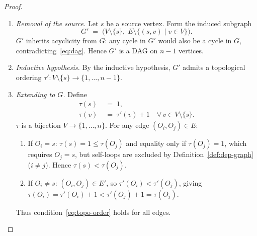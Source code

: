 \documentclass[12pt,openany]{book}
\numberwithin{equation}{chapter}
\theoremstyle{plain}
\theoremstyle{definition}
\theoremstyle{remark}
\numberwithin{equation}{chapter}
\theoremstyle{plain}
\begin{document}
\begin{proof}
\begin{enumerate}
\begin{enumerate}
          \item \emph{Removal of the source.}
                Let $s$ be a source vertex.  Form the induced subgraph
                \begin{equation}
                  G' \;=\; \bigl(V \setminus \{s\},\;
                    E \setminus \{(s, v) \mid v \in V\}\bigr).
                  \label{eq:induced-sub}
                \end{equation}
                $G'$ inherits acyclicity from $G$: any cycle in $G'$
                would also be a cycle in $G$, contradicting~\eqref{eq:dag}.
                Hence $G'$ is a DAG on $n-1$ vertices.

          \item \emph{Inductive hypothesis.}
                By the inductive hypothesis, $G'$ admits a topological
                ordering $\tau' : V \setminus \{s\} \to \{1, \ldots, n-1\}$.

          \item \emph{Extending to $G$.}
                Define
                \begin{align}
                  \tau(s)   &\;=\; 1, \label{eq:tau-source}\\
                  \tau(v)   &\;=\; \tau'(v) + 1
                    \quad \forall\, v \in V \setminus \{s\}.
                    \label{eq:tau-rest}
                \end{align}
                $\tau$ is a bijection $V \to \{1, \ldots, n\}$.
                For any edge $(O_i, O_j) \in E$:
                \begin{enumerate}
                  \item If $O_i = s$: $\tau(s) = 1 \leq \tau(O_j)$
                        and equality only if $\tau(O_j) = 1$, which
                        requires $O_j = s$, but self-loops are excluded
                        by Definition~\ref{def:dep-graph} ($i \neq j$).
                        Hence $\tau(s) < \tau(O_j)$.
                  \item If $O_i \neq s$: $(O_i, O_j) \in E'$, so
                        $\tau'(O_i) < \tau'(O_j)$, giving
                        $\tau(O_i) = \tau'(O_i)+1 < \tau'(O_j)+1
                        = \tau(O_j)$.
                \end{enumerate}
                Thus condition~\eqref{eq:topo-order} holds for all edges.
        \end{enumerate}


\end{enumerate}
\end{proof}
\end{document}
